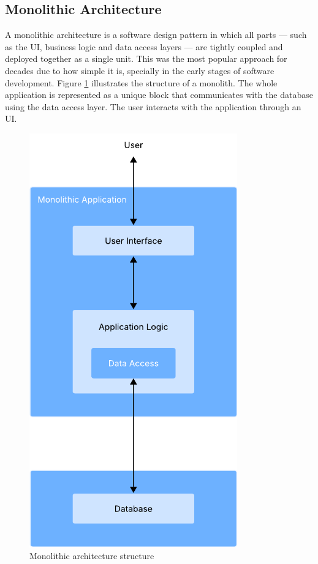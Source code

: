 \subsection{Monolithic Architecture}
A monolithic architecture is a software design pattern in which all parts ---
such as the \gls{UI}, business logic and data access layers --- are tightly
coupled and deployed together as a single unit\cite{7436659,10031648}. This
was the most popular approach for decades due to how simple it is, specially in
the early stages of software development\cite{Garlan2018}.
Figure \ref{fig:architectures:monolithic}
illustrates the structure of a monolith. The whole application is represented
as a unique block that communicates with the database using the data access
layer. The user interacts with the application through an \gls{UI}.
\begin{figure}[htbp]
	\centering
	\includegraphics[width=0.8\textwidth, height=0.5\textheight, keepaspectratio]{Chapters/Figures/Architectures/Monolith.pdf}
	\caption{Monolithic architecture structure}
	\label{fig:architectures:monolithic}
\end{figure}

